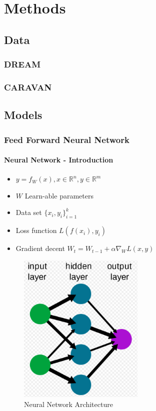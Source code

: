 \documentclass[12pt]{report}
\begin{document}
\chapter{Methods} 
\section{Data}
\subsection{DREAM}
\subsection{CARAVAN}

\section{Models}
\subsection{Feed Forward Neural Network}

\subsubsection{Neural Network - Introduction}
\begin{itemize}
	\item $y = f_{W}(x), x \in \mathbb{R}^n, y \in \mathbb{R}^m$ 
	\item $W$ Learn-able parameters
	\item Data set $\{x_i, y_i \}_{i=1}^k$
	\item Loss function $L(f(x_i), y_i)$
	\item Gradient decent $W_t = W_{t-1} + \alpha \nabla_{W}L(x,y) $ 
\end{itemize}

\begin{figure}[H]\centering\includegraphics[width=6cm]{FFNN.png}\caption{Neural Network Architecture}\end{figure}
\end{document}

